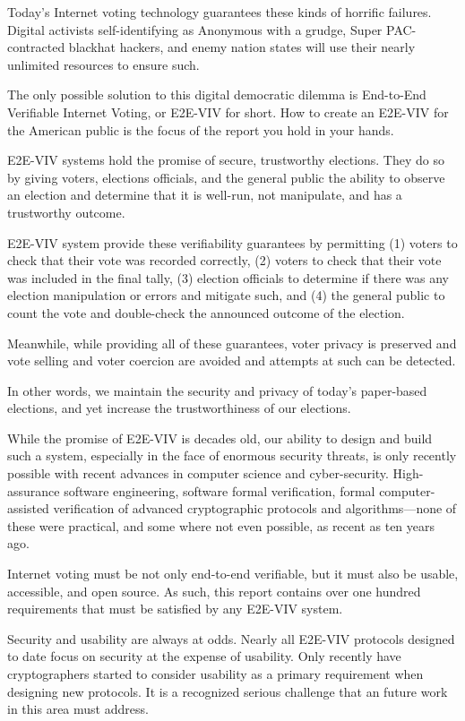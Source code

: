 Today's Internet voting technology guarantees these kinds of horrific
failures. Digital activists self-identifying as Anonymous with a
grudge, Super PAC-contracted blackhat hackers, and enemy nation states
will use their nearly unlimited resources to ensure such.

The only possible solution to this digital democratic dilemma is
End-to-End Verifiable Internet Voting, or E2E-VIV for short. How to
create an E2E-VIV for the American public is the focus of the report
you hold in your hands.

E2E-VIV systems hold the promise of secure, trustworthy
elections. They do so by giving voters, elections officials, and the
general public the ability to observe an election and determine that
it is well-run, not manipulate, and has a trustworthy outcome. 

E2E-VIV system provide these verifiability guarantees by permitting
(1) voters to check that their vote was recorded correctly, (2) voters
to check that their vote was included in the final tally, (3) election
officials to determine if there was any election manipulation or
errors and mitigate such, and (4) the general public to count the vote
and double-check the announced outcome of the election. 

Meanwhile, while providing all of these guarantees, voter privacy is
preserved and vote selling and voter coercion are avoided and attempts
at such can be detected. 

In other words, we maintain the security and privacy of today's
paper-based elections, and yet increase the trustworthiness of our
elections.

While the promise of E2E-VIV is decades old, our ability to design and
build such a system, especially in the face of enormous security
threats, is only recently possible with recent advances in computer
science and cyber-security.  High-assurance software engineering,
software formal verification, formal computer-assisted verification of
advanced cryptographic protocols and algorithms—none of these were
practical, and some where not even possible, as recent as ten years
ago.

Internet voting must be not only end-to-end verifiable, but it must
also be usable, accessible, and open source.  As such, this report
contains over one hundred requirements that must be satisfied by any
E2E-VIV system.

Security and usability are always at odds. Nearly all E2E-VIV
protocols designed to date focus on security at the expense of
usability.  Only recently have cryptographers started to consider
usability as a primary requirement when designing new protocols.  It
is a recognized serious challenge that an future work in this area
must address.

